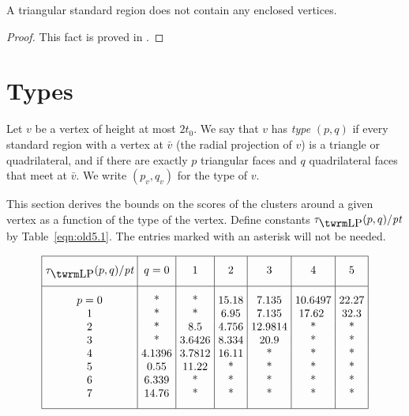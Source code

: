 \begin{lemma}
        \label{lemma:no-enclosed-tri}
        A triangular standard region does not contain any enclosed
        vertices.
\end{lemma}

\begin{proof}
    This fact is proved in \cite[Lemma~3.7]{part1}.
\end{proof}

\section{Types}\label{sec:types}

Let $v$ be a vertex of height at most $2t_0$.  We say that $v$ has
{\it type\/} $(p,q)$ if every standard region with a vertex at
$\bar v$ (the radial projection of $v$) is a triangle or
quadrilateral, and if there are exactly $p$ triangular faces and
$q$ quadrilateral faces that meet at $\bar v$.  We write
$(p_v,q_v)$ for the type of $v$.


This section derives the bounds on the scores of the clusters
around a given vertex as a function of the type of the vertex.
Define constants $\tlp(p,q)/\pt$ by Table~\ref{eqn:old5.1}.  The
entries marked with an asterisk will not be needed.

\bigskip



\begin{equation}
\vbox{\offinterlineskip \hrule
\halign{&\vrule#&\strut\ \hfil#\hfil\ \cr   %
height 7pt&\omit&&\omit&&\omit&&\omit&&\omit&&\omit&&\omit&\cr
&\hfil $\tlp(p,q)/\pt$\hfil
        &&\hfil $q=0$\hfil
        &&\hfil1\hfil
        &&\hfil2\hfil
        &&\hfil3\hfil
        &&\hfil4\hfil
        &&\hfil5\hfil&
\cr height 7pt&\omit&&\omit&&\omit&&\omit&&\omit&&\omit&&\omit&\cr
\noalign{\hrule}
height7pt&\omit&&\omit&&\omit&&\omit&&\omit&&\omit&&\omit&\cr
&$p=0$&& *&& *&& 15.18&& 7.135&& 10.6497&& 22.27&\cr &1&&    *&&
*&&  6.95&& 7.135&&17.62  && 32.3&\cr &2&&    *&&
8.5&&4.756&&12.9814&&*&&*&\cr &3&& *&&
3.6426&&8.334&&20.9&&*&&*&\cr
&4&&4.1396&&3.7812&&16.11&&*&&*&&*&\cr
&5&&0.55&&11.22&&*&&*&&*&&*&\cr &6&&6.339&&*&&*&&*&&*&&*&\cr
&7&&14.76&&*&&*&&*&&*&&*&\cr
height7pt&\omit&&\omit&&\omit&&\omit&&\omit&&\omit&&\omit&\cr}
\hrule }
    \label{eqn:old5.1}
\end{equation}



